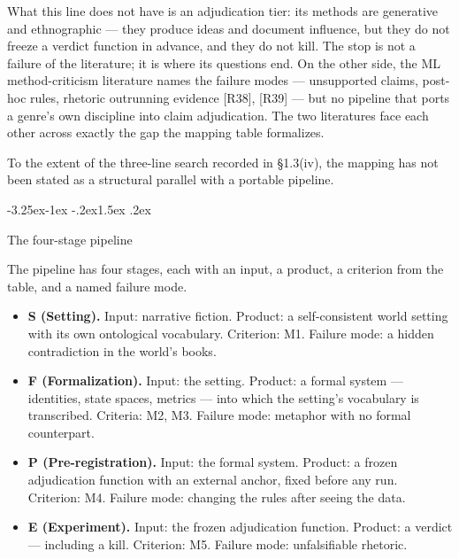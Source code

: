 \documentclass[11pt,a4paper]{article}
\makeatletter
\renewcommand\subsection{\@startsection{subsection}{2}{\z@}%
  {-3.25ex\@plus -1ex \@minus -.2ex}{1.5ex \@plus .2ex}%
  {\normalfont\large\bfseries\raggedright}}
\makeatother
\begin{document}
What this line does not have is an adjudication tier: its methods are generative and ethnographic — they produce ideas and document influence, but they do not freeze a verdict function in advance, and they do not kill. The stop is not a failure of the literature; it is where its questions end. On the other side, the ML method-criticism literature names the failure modes — unsupported claims, post-hoc rules, rhetoric outrunning evidence [R38], [R39] — but no pipeline that ports a genre's own discipline into claim adjudication. The two literatures face each other across exactly the gap the mapping table formalizes.

To the extent of the three-line search recorded in §1.3(iv), the mapping has not been stated as a structural parallel with a portable pipeline.

\subsection{The four-stage pipeline}

The pipeline has four stages, each with an input, a product, a criterion from the table, and a named failure mode.

\begin{itemize}[leftmargin=1.6em,itemsep=2pt,parsep=0pt,topsep=3pt]
\item \textbf{S (Setting).} Input: narrative fiction. Product: a self-consistent world setting with its own ontological vocabulary. Criterion: M1. Failure mode: a hidden contradiction in the world's books.
\item \textbf{F (Formalization).} Input: the setting. Product: a formal system — identities, state spaces, metrics — into which the setting's vocabulary is transcribed. Criteria: M2, M3. Failure mode: metaphor with no formal counterpart.
\item \textbf{P (Pre-registration).} Input: the formal system. Product: a frozen adjudication function with an external anchor, fixed before any run. Criterion: M4. Failure mode: changing the rules after seeing the data.
\item \textbf{E (Experiment).} Input: the frozen adjudication function. Product: a verdict — including a kill. Criterion: M5. Failure mode: unfalsifiable rhetoric.
\end{itemize}
\end{document}
